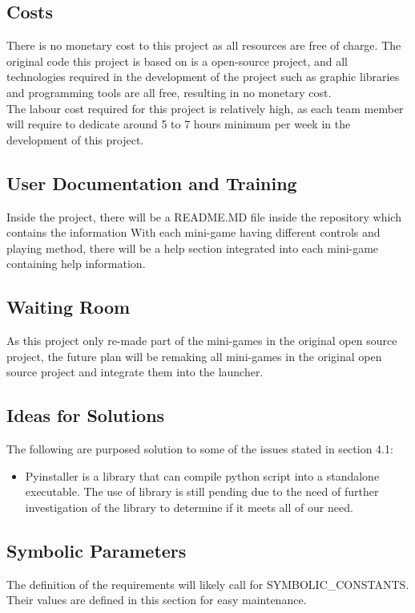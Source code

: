 \documentclass[12pt, titlepage]{article}
\begin{document}
\subsection{Costs}

There is no monetary cost to this project as all resources are free of charge. The original code this project is based on is a open-source project, and all technologies required in the development of the project such as graphic libraries and programming tools are all free, resulting in no monetary cost.\\
The labour cost required for this project is relatively high, as each team member will require to dedicate around 5 to 7 hours minimum per week in the development of this project.

\subsection{User Documentation and Training}

Inside the project, there will be a README.MD file inside the repository which contains the information
With each mini-game having different controls and playing method, there will be a help section integrated into each mini-game containing help information.

\subsection{Waiting Room}

As this project only re-made part of the mini-games in the original open source project, the future plan will be remaking all mini-games in the original open source project and integrate them into the launcher.

\subsection{Ideas for Solutions}

The following are purposed solution to some of the issues stated in section 4.1:
\begin{itemize}
    \item Pyinstaller is a library that can compile python script into a standalone executable. The use of library is still pending due to the need of further investigation of the library to determine if it meets all of our need.
\end{itemize}





\newpage

\subsection{Symbolic Parameters}

The definition of the requirements will likely call for SYMBOLIC\_CONSTANTS.
Their values are defined in this section for easy maintenance.
\end{document}
